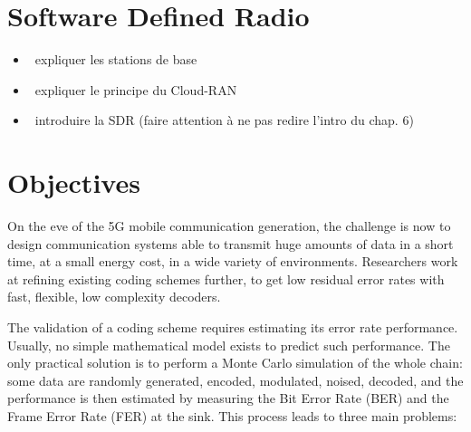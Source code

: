 \section{Software Defined Radio}

\begin{itemize}
  \item \xmark~expliquer les stations de base
  \item \xmark~expliquer le principe du Cloud-RAN
  \item \xmark~introduire la SDR (faire attention à ne pas redire l'intro du
    chap. 6)
\end{itemize}

\section{Objectives}


On the eve of the 5G mobile communication generation, the challenge is now to
design communication systems able to transmit huge amounts of data in a short
time, at a small energy cost, in a wide variety of environments. Researchers
work at refining existing coding schemes further, to get low residual error
rates with fast, flexible, low complexity decoders.

The validation of a coding scheme requires estimating its error rate
performance. Usually, no simple mathematical model exists to predict such
performance. The only practical solution is to perform a Monte Carlo simulation
of the whole chain: some data are randomly generated, encoded, modulated,
noised, decoded, and the performance is then estimated by measuring the Bit
Error Rate (BER) and the Frame Error Rate (FER) at the sink. This process leads
to three main problems:

